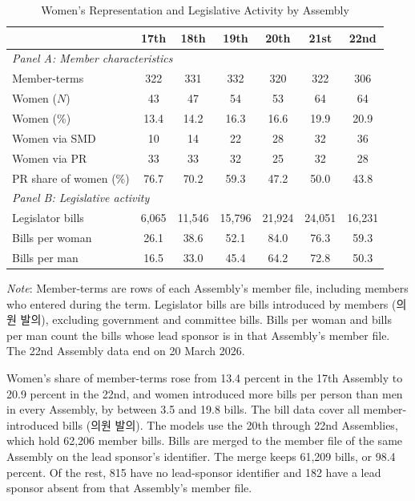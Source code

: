 \documentclass[11pt]{article}
\begin{document}
\begin{table}[htbp]
\centering
\caption{Women's Representation and Legislative Activity by Assembly}
\label{tab:desc}
\small
\begin{tabular}{lcccccc}
\toprule
& 17th & 18th & 19th & 20th & 21st & 22nd \\
\midrule
\multicolumn{7}{l}{\textit{Panel A: Member characteristics}} \\[3pt]
Member-terms             & 322 & 331 & 332 & 320 & 322 & 306 \\
Women ($N$)              & 43 & 47 & 54 & 53 & 64 & 64 \\
Women (\%)               & 13.4 & 14.2 & 16.3 & 16.6 & 19.9 & 20.9 \\
Women via SMD            & 10 & 14 & 22 & 28 & 32 & 36 \\
Women via PR             & 33 & 33 & 32 & 25 & 32 & 28 \\
PR share of women (\%)   & 76.7 & 70.2 & 59.3 & 47.2 & 50.0 & 43.8 \\
\midrule
\multicolumn{7}{l}{\textit{Panel B: Legislative activity}} \\[3pt]
Legislator bills         & 6,065 & 11,546 & 15,796 & 21,924 & 24,051 & 16,231 \\
Bills per woman          & 26.1 & 38.6 & 52.1 & 84.0 & 76.3 & 59.3 \\
Bills per man            & 16.5 & 33.0 & 45.4 & 64.2 & 72.8 & 50.3 \\
\bottomrule
\end{tabular}

\vspace{4pt}
\parbox{0.92\textwidth}{\footnotesize \textit{Note}: Member-terms are rows of each Assembly's member file, including members who entered during the term. Legislator bills are bills introduced by members (의원 발의), excluding government and committee bills. Bills per woman and bills per man count the bills whose lead sponsor is in that Assembly's member file. The 22nd Assembly data end on 20 March 2026.}
\end{table}

Women's share of member-terms rose from 13.4 percent in the 17th Assembly to 20.9 percent in the 22nd, and women introduced more bills per person than men in every Assembly, by between 3.5 and 19.8 bills. The bill data cover all member-introduced bills (의원 발의). The models use the 20th through 22nd Assemblies, which hold 62,206 member bills. Bills are merged to the member file of the same Assembly on the lead sponsor's identifier. The merge keeps 61,209 bills, or 98.4 percent. Of the rest, 815 have no lead-sponsor identifier and 182 have a lead sponsor absent from that Assembly's member file.
\end{document}

